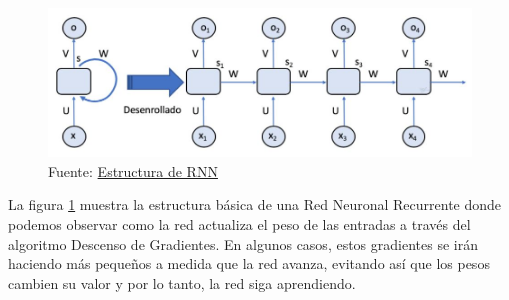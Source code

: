 \documentclass[11pt,a4paper,spanish]{book}
\begin{document}
	\begin{figure}[H]
		\centering
		\includegraphics[scale=0.30]{rnn_structure.JPG} 
		\caption{Fuente:  \href{http://personal.cimat.mx:8181/~mrivera/cursos/aprendizaje_profundo/RNN_LTSM/introduccion_rnn.html}{Estructura de RNN}}
		\label{fig:rnn_structure}
	\end{figure}
	
	La figura \ref{fig:rnn_structure} muestra la estructura básica de una Red Neuronal Recurrente donde podemos observar como la red actualiza el peso de las entradas a través del algoritmo Descenso de Gradientes. En algunos casos, estos gradientes se irán haciendo más pequeños a medida que la red avanza, evitando así que los pesos cambien su valor y por lo tanto, la red siga aprendiendo. 
	
\end{document}
